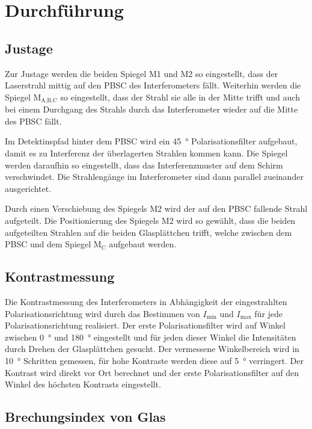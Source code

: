 \section{Durchführung}

\subsection{Justage}
Zur Justage werden die beiden Spiegel M1 und M2 so eingestellt, dass der Laserstrahl mittig auf den PBSC des Interferometers fällt.
Weiterhin werden die Spiegel M$_\text{A,B,C}$ so eingestellt, dass der Strahl sie alle in der Mitte trifft und auch bei einem Durchgang des Strahls durch das Interferometer wieder auf die Mitte des PBSC fällt.\par
Im Detektinspfad hinter dem PBSC wird ein \SI{45}{\degree} Polarisationsfilter aufgebaut, damit es zu Interferenz der überlagerten Strahlen kommen kann.
Die Spiegel werden daraufhin so eingestellt, dass das Interferenzmuster auf dem Schirm verschwindet.
Die Strahlengänge im Interferometer sind dann parallel zueinander ausgerichtet.
\par\smallskip
Durch einen Verschiebung des Spiegels M2 wird der auf den PBSC fallende Strahl aufgeteilt.
Die Positionierung des Spiegels M2 wird so gewählt, dass die beiden aufgeteilten Strahlen auf die beiden Glasplättchen trifft, welche zwischen dem PBSC und dem Spiegel M$_\text{C}$ aufgebaut werden.

\subsection{Kontrastmessung}
Die Kontrastmessung des Interferometers in Abhängigkeit der eingestrahlten Polarisationsrichtung wird durch das Bestimmen von $I_\text{min}$ und $I_\text{max}$ für jede Polarisationsrichtung realisiert.
Der erste Polarisationsfilter wird auf Winkel zwischen \SI{0}{\degree} und \SI{180}{\degree} eingestellt und für jeden dieser Winkel die Intensitäten durch Drehen der Glasplättchen gesucht.
Der vermessene Winkelbereich wird in \SI{10}{\degree} Schritten gemessen, für hohe Kontraste werden diese auf \SI{5}{\degree} verringert.
Der Kontrast wird direkt vor Ort berechnet und der erste Polarisationsfilter auf den Winkel des höchsten Kontrasts eingestellt.

\subsection{Brechungsindex von Glas}

